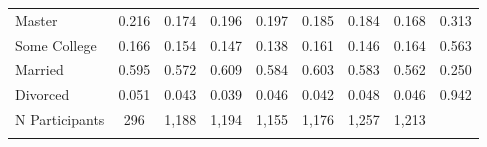 \begin{center}
\begin{tabular}{lcccccccc}
Master & 0.216 & 0.174 & 0.196 & 0.197 & 0.185 & 0.184 & 0.168 & 0.313\\
Some College & 0.166 & 0.154 & 0.147 & 0.138 & 0.161 & 0.146 & 0.164 & 0.563\\
Married & 0.595 & 0.572 & 0.609 & 0.584 & 0.603 & 0.583 & 0.562 & 0.250\\
Divorced & 0.051 & 0.043 & 0.039 & 0.046 & 0.042 & 0.048 & 0.046 & 0.942\\
N Participants & 296 & 1,188 & 1,194 & 1,155 & 1,176 & 1,257 & 1,213 & \\
\noalign{\smallskip}\hline\end{tabular}\\
\end{center}
